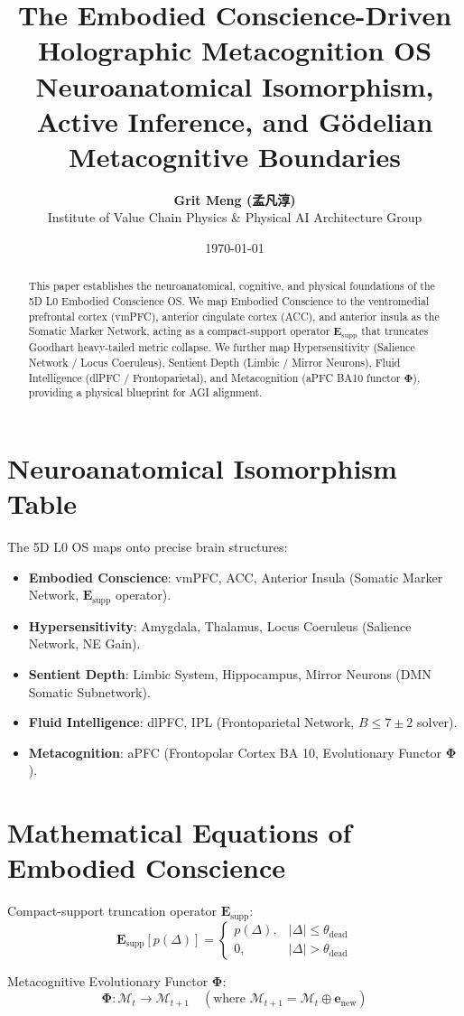 \documentclass[11pt,a4paper]{article}
\title{\textbf{The Embodied Conscience-Driven Holographic Metacognition OS}\\ \large Neuroanatomical Isomorphism, Active Inference, and Gödelian Metacognitive Boundaries}
\author{\textbf{Grit Meng (孟凡淳)}\\ \small Institute of Value Chain Physics \& Physical AI Architecture Group}
\date{\today}
\begin{document}
\maketitle

\begin{abstract}
This paper establishes the neuroanatomical, cognitive, and physical foundations of the 5D L0 Embodied Conscience OS. We map Embodied Conscience to the ventromedial prefrontal cortex (vmPFC), anterior cingulate cortex (ACC), and anterior insula as the Somatic Marker Network, acting as a compact-support operator $\mathbf{E}_{\text{supp}}$ that truncates Goodhart heavy-tailed metric collapse. We further map Hypersensitivity (Salience Network / Locus Coeruleus), Sentient Depth (Limbic / Mirror Neurons), Fluid Intelligence (dlPFC / Frontoparietal), and Metacognition (aPFC BA10 functor $\mathbf{\Phi}$), providing a physical blueprint for AGI alignment.
\end{abstract}

\section{Neuroanatomical Isomorphism Table}
The 5D L0 OS maps onto precise brain structures:
\begin{itemize}
    \item \textbf{Embodied Conscience}: vmPFC, ACC, Anterior Insula (Somatic Marker Network, $\mathbf{E}_{\text{supp}}$ operator).
    \item \textbf{Hypersensitivity}: Amygdala, Thalamus, Locus Coeruleus (Salience Network, NE Gain).
    \item \textbf{Sentient Depth}: Limbic System, Hippocampus, Mirror Neurons (DMN Somatic Subnetwork).
    \item \textbf{Fluid Intelligence}: dlPFC, IPL (Frontoparietal Network, $B \le 7 \pm 2$ solver).
    \item \textbf{Metacognition}: aPFC (Frontopolar Cortex BA 10, Evolutionary Functor $\mathbf{\Phi}$).
\end{itemize}

\section{Mathematical Equations of Embodied Conscience}
Compact-support truncation operator $\mathbf{E}_{\text{supp}}$:
\begin{equation}
\mathbf{E}_{\text{supp}}[p(\Delta)] = \begin{cases} p(\Delta), & |\Delta| \le \theta_{\text{dead}} \\ 0, & |\Delta| > \theta_{\text{dead}} \end{cases}
\end{equation}

Metacognitive Evolutionary Functor $\mathbf{\Phi}$:
\begin{equation}
\mathbf{\Phi}: \mathcal{M}_t \to \mathcal{M}_{t+1} \quad (\text{where } \mathcal{M}_{t+1} = \mathcal{M}_t \oplus \mathbf{e}_{\text{new}})
\end{equation}
\end{document}
